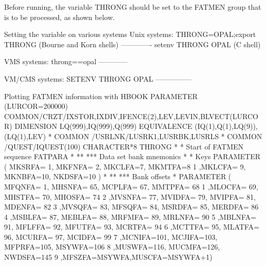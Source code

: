Before running, the variable THRONG should be set to the FATMEN
group that is to be processed, as shown below.
\begin{XMPt}{Setting the  variable on various systems}
Unix systems:        THRONG=OPAL;export THRONG {\rm (Bourne and Korn shells)}
-------------        setenv THRONG OPAL        {\rm (C shell)}

VMS systems:         throng==opal
------------

VM/CMS systems:      SETENV THRONG OPAL
---------------
\end{XMPt}
\begin{XMPt}{Plotting FATMEN information with HBOOK}
      PARAMETER (LURCOR=200000)                                         
      COMMON/CRZT/IXSTOR,IXDIV,IFENCE(2),LEV,LEVIN,BLVECT(LURCOR)       
      DIMENSION    LQ(999),IQ(999),Q(999)                               
      EQUIVALENCE (IQ(1),Q(1),LQ(9)),(LQ(1),LEV)                        
*                                                                       
      COMMON /USRLNK/LUSRK1,LUSRBK,LUSRLS                               
*                                                                       
      COMMON /QUEST/IQUEST(100)                                         
      CHARACTER*8   THRONG
*                                                                       
* Start of FATMEN sequence FATPARA                                      
*                                                                       
** ***     Data set bank mnemonics                                      
*                                                                       
*          Keys                                                         
      PARAMETER ( MKSRFA= 1, MKFNFA= 2, MKCLFA=7, MKMTFA=8              
     1           ,MKLCFA= 9, MKNBFA=10, NKDSFA=10 )                     
*                                                                       
** ***     Bank offsets                                                 
*                                                                       
      PARAMETER ( MFQNFA=  1, MHSNFA= 65, MCPLFA= 67, MMTPFA= 68        
     1           ,MLOCFA= 69, MHSTFA= 70, MHOSFA= 74                    
     2           ,MVSNFA= 77, MVIDFA= 79, MVIPFA= 81, MDENFA= 82        
     3           ,MVSQFA= 83, MFSQFA= 84, MSRDFA= 85, MERDFA= 86        
     4           ,MSBLFA= 87, MEBLFA= 88, MRFMFA= 89, MRLNFA= 90        
     5           ,MBLNFA= 91, MFLFFA= 92, MFUTFA= 93, MCRTFA= 94        
     6           ,MCTTFA= 95, MLATFA= 96, MCURFA= 97, MCIDFA= 99        
     7           ,MCNIFA=101, MCJIFA=103, MFPRFA=105, MSYWFA=106        
     8           ,MUSWFA=116, MUCMFA=126, NWDSFA=145                    
     9           ,MFSZFA=MSYWFA,MUSCFA=MSYWFA+1)                        
                                                                        

\end{XMPt}

